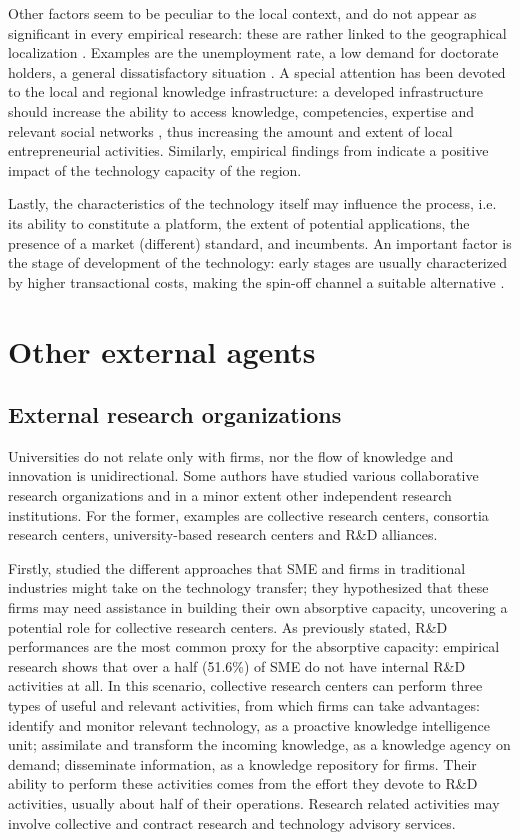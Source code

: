Other factors seem to be peculiar to the local context, and do not appear as significant in every empirical research: these are rather linked to the geographical localization \citep{OShea2004}. Examples are the unemployment rate, a low demand for doctorate holders, a general dissatisfactory situation \citep{Rizzo2015}. A special attention has been devoted to the local and regional knowledge infrastructure: a developed infrastructure should increase the ability to access knowledge, competencies, expertise and relevant social networks \citep{OShea2004}, thus increasing the amount and extent of local entrepreneurial activities. Similarly, empirical findings from \citet{Audretsch2005} indicate a positive impact of the technology capacity of the region.

Lastly, the characteristics of the technology itself may influence the process, i.e. its ability to constitute a platform, the extent of potential applications, the presence of a market (different) standard, and incumbents. An important factor is the stage of development of the technology: early stages are usually characterized by higher transactional costs, making the spin-off channel a suitable alternative \citep{Rizzo2015}. 

\section{Other external agents}

\subsection{External research organizations}

Universities do not relate only with firms, nor the flow of knowledge and innovation is unidirectional. Some authors have studied various collaborative research organizations and in a minor extent other independent research institutions. For the former, examples are collective research centers, consortia research centers, university-based research centers and R\&D alliances. 

Firstly, \citet{Spithoven2011} studied the different approaches that SME and firms in traditional industries might take on the technology transfer; they hypothesized that these firms may need assistance in building their own absorptive capacity, uncovering a potential role for collective research centers. As previously stated, R\&D performances are the most common proxy for the absorptive capacity: empirical research shows that over a half (51.6\%) of SME do not have internal R\&D activities at all. In this scenario, collective research centers can perform three types of useful and relevant activities, from which firms can take advantages: identify and monitor relevant technology, as a proactive knowledge intelligence unit; assimilate and transform the incoming knowledge, as a knowledge agency on demand; disseminate information, as a knowledge repository for firms. Their ability to perform these activities comes from the effort they devote to R\&D activities, usually about half of their operations. Research related activities may involve collective and contract research and technology advisory services.


